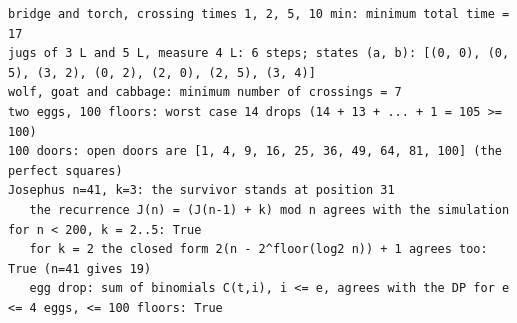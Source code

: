 \documentclass[10pt,a4paper,openany,oneside]{report}
\begin{document}
\begin{lstlisting}[style=out,basicstyle=\ttfamily\fontsize{7.2}{8.6}\selectfont,title={ap\_puzzles.py: output}]
bridge and torch, crossing times 1, 2, 5, 10 min: minimum total time = 17
jugs of 3 L and 5 L, measure 4 L: 6 steps; states (a, b): [(0, 0), (0, 5), (3, 2), (0, 2), (2, 0), (2, 5), (3, 4)]
wolf, goat and cabbage: minimum number of crossings = 7
two eggs, 100 floors: worst case 14 drops (14 + 13 + ... + 1 = 105 >= 100)
100 doors: open doors are [1, 4, 9, 16, 25, 36, 49, 64, 81, 100] (the perfect squares)
Josephus n=41, k=3: the survivor stands at position 31
   the recurrence J(n) = (J(n-1) + k) mod n agrees with the simulation for n < 200, k = 2..5: True
   for k = 2 the closed form 2(n - 2^floor(log2 n)) + 1 agrees too: True (n=41 gives 19)
   egg drop: sum of binomials C(t,i), i <= e, agrees with the DP for e <= 4 eggs, <= 100 floors: True
\end{lstlisting}
\end{document}
